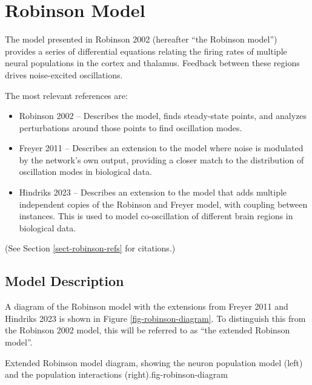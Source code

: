
\chapter{Robinson Model}
\label{sect-robinson}

The model presented in Robinson 2002 (hereafter ``the Robinson model'')
provides a series of differential equations relating the firing rates of
multiple neural populations in the cortex and thalamus. Feedback between
these regions drives noise-excited oscillations.

The most relevant references are:
\begin{itemize}
\item Robinson 2002 -- Describes the model, finds steady-state points, and
analyzes perturbations around those points to find oscillation modes.
\item Freyer 2011 -- Describes an extension to the model where noise is
modulated by the network's own output, providing a closer match to the
distribution of oscillation modes in biological data.
\item Hindriks 2023 -- Describes an extension to the model that adds multiple
independent copies of the Robinson and Freyer model, with coupling between
instances. This is used to model co-oscillation of different brain regions
in biological data.
\end{itemize}
(See Section \ref{sect-robinson-refs} for citations.)

%
%
\section{Model Description}
\label{sect-robinson-model}

A diagram of the Robinson model with the extensions from Freyer 2011 and
Hindriks 2023 is shown in Figure \ref{fig-robinson-diagram}. To distinguish
this from the Robinson 2002 model, this will be referred to as ``the
extended Robinson model''.

{Extended Robinson model diagram, showing the neuron population model
(left) and the population interactions (right).}{fig-robinson-diagram}

